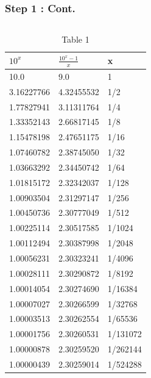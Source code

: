 \documentclass{beamer}
\begin{document}
\begin{frame}
    \frametitle{Step 1 : Cont.}
    \begin{columns}
    \begin{table}[]
        \caption{Table 1}
        \tiny
        \centering
        \def\arraystretch{1.2}
        \begin{tabular}{|l|l|l|} \hline
        $10^x$ & $\frac{10^x-1}{x}$ & x        \\ \hline  \hline
        10.0                  & 9.0                         & 1        \\ \hline
        3.16227766    & 4.32455532          & 1/2      \\ \hline
        1.77827941    & 3.11311764          & 1/4      \\ \hline
        1.33352143    & 2.66817145          & 1/8      \\ \hline
        1.15478198    & 2.47651175          & 1/16     \\ \hline
        1.07460782    & 2.38745050          & 1/32     \\ \hline
        1.03663292    & 2.34450742          & 1/64     \\ \hline
        1.01815172    & 2.32342037          & 1/128    \\ \hline
        1.00903504    & 2.31297147          & 1/256    \\ \hline
        1.00450736    & 2.30777049          & 1/512    \\ \hline
        1.00225114    & 2.30517585          & 1/1024   \\ \hline
        1.00112494    & 2.30387998          & 1/2048   \\ \hline
        1.00056231    & 2.30323241          & 1/4096   \\ \hline
        1.00028111    & 2.30290872          & 1/8192   \\ \hline
        1.00014054    & 2.30274690          & 1/16384  \\ \hline
        1.00007027    & 2.30266599          & 1/32768  \\ \hline
        1.00003513    & 2.30262554          & 1/65536  \\ \hline
        1.00001756    & 2.30260531         & 1/131072 \\ \hline
        1.00000878    & 2.30259520          & 1/262144 \\ \hline
        1.00000439    & 2.30259014          & 1/524288 \\ \hline

\end{tabular}
\end{table}
\end{columns}
\end{frame}
\end{document}
